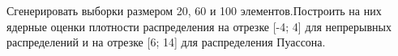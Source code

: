 \item Сгенерировать выборки размером 20, 60 и 100 элементов.\newline Построить на них ядерные
    оценки плотности распределения на отрезке [-4; 4] для непрерывных распределений и на отрезке [6; 14] для распределения Пуассона.